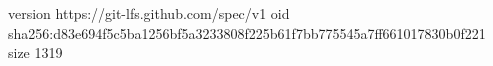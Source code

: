 version https://git-lfs.github.com/spec/v1
oid sha256:d83e694f5c5ba1256bf5a3233808f225b61f7bb775545a7ff661017830b0f221
size 1319

